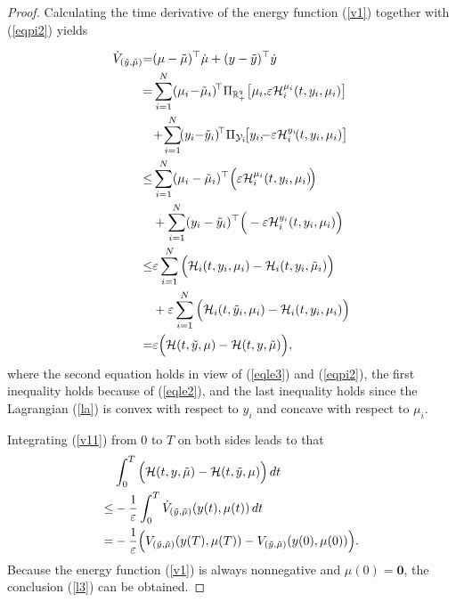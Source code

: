 \documentclass[letterpaper, 10 pt, conference]{ieeeconf}  %
\begin{document}
\begin{proof}
	Calculating the time derivative of the energy function (\ref{v1}) together with (\ref{eqpi2}) yields
	
	\begin{align}
		\dot{V}_{(\tilde{y}, \tilde{\mu})}
		{=} 
		&(\mu-\tilde{\mu})^\top \dot{\mu} + (y-\tilde{y})^\top \dot{y}\notag\\
		=
		&\sum_{i=1}^{N} (\mu_i\!-\!\tilde{\mu}_i)\!^{\top} \Pi_{\mathbb{R}_+^q}\big[\mu_i,\!\varepsilon\mathcal{H}_i^{\mu_i}(t,y_i,\mu_i)\big] \notag\\
		& \!+\! \sum_{i=1}^{N} \!(y_i{-}\tilde{y}_i)\!^\top \Pi_{\mathcal{Y}_i}\!\big[y_i,\! \!-\varepsilon\mathcal{H}_i^{y_i}\!(t,y_i,\mu_i)\big] \notag\\
		\le
		& \sum_{i=1}^{N} (\mu_i-\tilde{\mu}_i)^\top \Big(\varepsilon\mathcal{H}_i^{\mu_i}(t,y_i,\mu_i)\!\Big) \notag\\
		& + \sum_{i=1}^{N} (y_i-\tilde{y}_i)^\top \Big(-\varepsilon\mathcal{H}_i^{y_i} (t,y_i,\mu_i)\Big) \notag\\
		\le 
		& \varepsilon \sum_{i=1}^{N} \Big(\mathcal{H}_i(t,y_i,\mu_i) - \mathcal{H}_i(t,y_i,\tilde{\mu}_i)\Big) \notag\\
		& + \varepsilon \sum_{i=1}^{N} \Big(\mathcal{H}_i (t,\tilde{y}_i,\mu_i) - \mathcal{H}_i (t,y_i,\mu_i)\Big) \notag\\
		= 
		&\varepsilon \Big(\mathcal{H}(t,\tilde{y},\mu) - \mathcal{H}(t,y,\tilde{\mu})\Big),\label{v11}
	\end{align}
	where the second equation holds in view of (\ref{eqle3}) and (\ref{eqpi2}), the first inequality  holds because of  (\ref{eqle2}), and the last inequality holds since the Lagrangian (\ref{la}) is convex with respect to $y_i$ and concave with respect to $\mu_i$.
	
	Integrating (\ref{v11}) from $0$ to $T$ on both sides leads to that
	\begin{align}
		&\int_{0}^{T} \Big( \mathcal{H}(t,y,\tilde{\mu})-\mathcal{H}(t,\tilde{y},\mu)\Big) \,dt\notag\\
		\le&-\frac{1}{\varepsilon}\int_{0}^{T} \dot{V}_{(\tilde{y}, \tilde{\mu})} (y(t), \mu(t)) \,dt\notag\\
		=&-\frac{1}{\varepsilon}\Big(V_{(\tilde{y}, \tilde{\mu})}(y(T), \mu(T)) - V_{(\tilde{y}, \tilde{\mu})}(y(0), \mu(0))\Big).
	\end{align}
	Because the energy function (\ref{v1}) is always nonnegative and $\mu(0)=\boldsymbol{0}$, the conclusion (\ref{l3}) can be obtained.
\end{proof}
\end{document}
